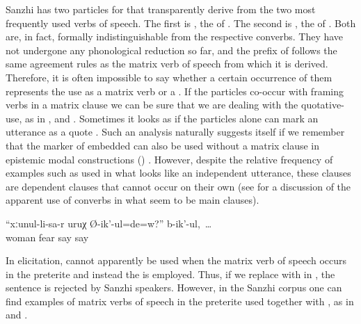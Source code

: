 Sanzhi has two  particles for  that transparently derive from the two most frequently used verbs of speech. The first is , the  of . The second is , the  of . Both are, in fact, formally indistinguishable from the respective converbs. They have not undergone any phonological reduction so far, and the  prefix of  follows the same agreement rules as the matrix verb of speech from which it is derived. Therefore, it is often impossible to say whether a certain occurrence of them represents the use as a matrix verb or a  . If the  particles co-occur with framing verbs in a matrix clause we can be sure that we are dealing with the quotative- use, as in ,  and . Sometimes it looks as if the  particles alone can mark an utterance as a quote . Such an analysis naturally suggests itself if we remember that the marker of embedded  can also be used without a matrix clause in epistemic modal constructions () \citep{ForkerLTSanzhi}. However, despite the relative frequency of examples such as  used in what looks like an independent utterance, these clauses are dependent clauses that cannot occur on their own (see  for a discussion of the apparent use of converbs in what seem to be main clauses).
%
\begin{exe}
	\ex	\label{ex:Are you afraid of your wife?, they say and}
	\gll	``xːunul-li-sa-r	uruχ	Ø-ik'-ul=de=w?''	b-ik'-ul,~\ldots\\
		woman	fear	say	say\\
	\glt	{}
\end{exe}

In elicitation,  cannot apparently be used when the matrix verb of speech occurs in the preterite and instead the   is employed. Thus, if we replace  with  in , the sentence is rejected by Sanzhi speakers. However, in the Sanzhi corpus one can find examples of matrix verbs of speech in the preterite used together with , as in  and .

